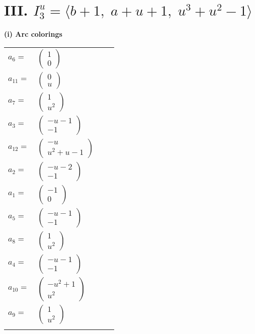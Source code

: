 \documentclass[1p]{elsarticle_modified}
\theoremstyle{definition}
\begin{document}
\centering \section*{III. $I^u_{3}= \langle b+1,\;a+u+1,\;u^3+u^2-1 \rangle$}
\flushleft \textbf{(i) Arc colorings}\\
\begin{tabular}{m{7pt} m{180pt} m{7pt} m{180pt} }
\flushright $a_{6}=$&$\begin{pmatrix}1\\0\end{pmatrix}$ \\
\flushright $a_{11}=$&$\begin{pmatrix}0\\u\end{pmatrix}$ \\
\flushright $a_{7}=$&$\begin{pmatrix}1\\u^2\end{pmatrix}$ \\
\flushright $a_{3}=$&$\begin{pmatrix}- u-1\\-1\end{pmatrix}$ \\
\flushright $a_{12}=$&$\begin{pmatrix}- u\\u^2+u-1\end{pmatrix}$ \\
\flushright $a_{2}=$&$\begin{pmatrix}- u-2\\-1\end{pmatrix}$ \\
\flushright $a_{1}=$&$\begin{pmatrix}-1\\0\end{pmatrix}$ \\
\flushright $a_{5}=$&$\begin{pmatrix}- u-1\\-1\end{pmatrix}$ \\
\flushright $a_{8}=$&$\begin{pmatrix}1\\u^2\end{pmatrix}$ \\
\flushright $a_{4}=$&$\begin{pmatrix}- u-1\\-1\end{pmatrix}$ \\
\flushright $a_{10}=$&$\begin{pmatrix}- u^2+1\\u^2\end{pmatrix}$ \\
\flushright $a_{9}=$&$\begin{pmatrix}1\\u^2\end{pmatrix}$\\&\end{tabular}
\end{document}
